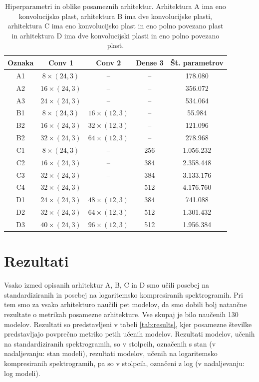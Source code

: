 \documentclass[a4paper, 12pt, openright]{book}
\begin{document}
\begin{table}[]
    \centering
    \begin{tabular}{c|c|c|c|c}
        Oznaka & Conv 1 & Conv 2 & Dense 3 & Št. parametrov \\
		\hline
        A1 & $ 8 \times (24, 3) $ & -- & -- & 178.080 \\
        A2 & $ 16 \times (24, 3) $ & -- & -- & 356.072 \\
        A3 & $ 24 \times (24, 3) $ & -- & -- & 534.064 \\
		\hline
		B1 & $ 8\times (24, 3) $ & $ 16 \times (12, 3) $ & -- & 55.984 \\
        B2 & $ 16\times (24, 3) $ & $ 32 \times (12, 3) $ & -- & 121.096 \\
        B2 & $ 32\times (24, 3) $ & $ 64 \times (12, 3) $ & -- & 278.968 \\
        \hline
        C1 & $ 8 \times (24, 3) $ & -- & 256 & 1.056.232 \\
        C2 & $ 16 \times (24, 3) $ & -- & 384 & 2.358.448 \\
        C3 & $ 32 \times (24, 3) $ & -- & 384 & 3.133.176 \\
        C4 & $ 32 \times (24, 3) $ & -- & 512 & 4.176.760 \\
		\hline
        D1 & $ 24 \times (24, 3) $ & $ 48 \times (12, 3) $ & 384 & 741.088 \\
        D2 & $ 32 \times (24, 3) $ & $ 64 \times (12, 3) $ & 512 & 1.301.432 \\
        D3 & $ 40 \times (24, 3) $ & $ 96 \times (12, 3) $ & 512 & 1.956.384 \\
    \end{tabular}
    \caption{Hiperparametri in oblike posameznih arhitektur. Arhitektura A ima eno konvolucijsko plast, arhitektura B ima dve konvolucijske plasti, arhitektura C ima eno konvolucijsko plast in eno polno povezano plast in arhitektura D ima dve konvolucijski plasti in eno polno povezano plast.}
    \label{tab:arhAll}
\end{table}


\chapter{Rezultati}
\label{ch:results}

Vsako izmed opisanih arhitektur A, B, C in D smo učili posebej na standardiziranih in posebej na logaritemsko kompresiranih spektrogramih.
Pri tem smo za vsako arhitekturo naučili pet modelov, da smo dobili bolj natančne rezultate o metrikah posamezne arhitekture.
Vse skupaj je bilo naučenih 130 modelov.
Rezultati so predstavljeni v tabeli \ref{tab:results}, kjer posamezne številke predstavljajo povprečno metriko petih učenih modelov.
Rezultati modelov, učenih na standardiziranih spektrogramih, so v stolpcih, označenih s stan (v nadaljevanju: stan modeli), rezultati modelov, učenih na logaritemsko kompresiranih spektrogramih, pa so v stolpcih, označeni z log (v nadaljevanju: log modeli).
\end{document}
